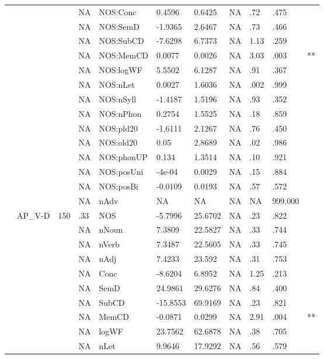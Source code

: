 \begin{table}[ht]
\begin{tabular}{lllllllllll}
   &  &  & NA & NOS:Conc & 0.4596 & 0.6425 & NA & .72 & .475 &   \\ 
   &  &  & NA & NOS:SemD & -1.9365 & 2.6467 & NA & .73 & .466 &   \\ 
   &  &  & NA & NOS:SubCD & -7.6298 & 6.7373 & NA & 1.13 & .259 &   \\ 
   &  &  & NA & NOS:MemCD & 0.0077 & 0.0026 & NA & 3.03 & .003 & ** \\ 
   &  &  & NA & NOS:logWF & 5.5502 & 6.1287 & NA & .91 & .367 &   \\ 
   &  &  & NA & NOS:nLet & 0.0027 & 1.6036 & NA & .002 & .999 &   \\ 
   &  &  & NA & NOS:nSyll & -1.4187 & 1.5196 & NA & .93 & .352 &   \\ 
   &  &  & NA & NOS:nPhon & 0.2754 & 1.5525 & NA & .18 & .859 &   \\ 
   &  &  & NA & NOS:pld20 & -1.6111 & 2.1267 & NA & .76 & .450 &   \\ 
   &  &  & NA & NOS:old20 & 0.05 & 2.8689 & NA & .02 & .986 &   \\ 
   &  &  & NA & NOS:phonUP & 0.134 & 1.3514 & NA & .10 & .921 &   \\ 
   &  &  & NA & NOS:posUni & -4e-04 & 0.0029 & NA & .15 & .884 &   \\ 
   &  &  & NA & NOS:posBi & -0.0109 & 0.0193 & NA & .57 & .572 &   \\ 
   &  &  & NA & nAdv & NA & NA & NA & NA & 999.000 &  \\ 
   & AP\_V-D & 150 & .33 & NOS & -5.7996 & 25.6702 & NA & .23 & .822 &   \\ 
   &  &  & NA & nNoun & 7.3809 & 22.5827 & NA & .33 & .744 &   \\ 
   &  &  & NA & nVerb & 7.3487 & 22.5605 & NA & .33 & .745 &   \\ 
   &  &  & NA & nAdj & 7.4233 & 23.592 & NA & .31 & .753 &   \\ 
   &  &  & NA & Conc & -8.6204 & 6.8952 & NA & 1.25 & .213 &   \\ 
   &  &  & NA & SemD & 24.9861 & 29.6276 & NA & .84 & .400 &   \\ 
   &  &  & NA & SubCD & -15.8553 & 69.9169 & NA & .23 & .821 &   \\ 
   &  &  & NA & MemCD & -0.0871 & 0.0299 & NA & 2.91 & .004 & ** \\ 
   &  &  & NA & logWF & 23.7562 & 62.6878 & NA & .38 & .705 &   \\ 
   &  &  & NA & nLet & 9.9646 & 17.9292 & NA & .56 & .579 &   \\ 

\end{tabular}
\end{table}

